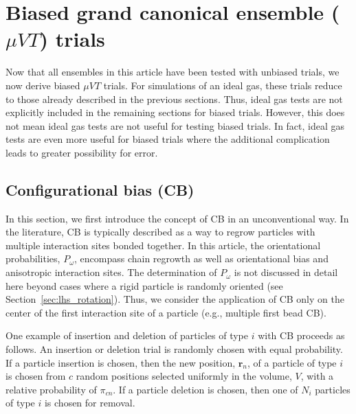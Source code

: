 \section{\label{sec:lhs_gcmc_bias}Biased grand canonical ensemble ($\mu VT$) trials}

Now that all ensembles in this article have been tested with unbiased trials, we now derive biased $\mu VT$ trials.
For simulations of an ideal gas, these trials reduce to those already described in the previous sections.
Thus, ideal gas tests are not explicitly included in the remaining sections for biased trials.
However, this does not mean ideal gas tests are not useful for testing biased trials.
In fact, ideal gas tests are even more useful for biased trials where the additional complication leads to greater possibility for error.

\subsection{\label{sec:lhs_insdel_cb}Configurational bias (CB)}

In this section, we first introduce the concept of CB \cite{rosenbluth_monte_1955, siepmann_configurational_1992, mooij_direct_1992, de_pablo_estimation_1992} in an unconventional way.
In the literature, CB is typically described as a way to regrow particles with multiple interaction sites bonded together.
In this article, the orientational probabilities, $P_{\omega}$, encompass chain regrowth as well as orientational bias and anisotropic interaction sites.
The determination of $P_{\omega}$ is not discussed in detail here beyond cases where a rigid particle is randomly oriented (see Section~\ref{sec:lhs_rotation}).
Thus, we consider the application of CB only on the center of the first interaction site of a particle (e.g., multiple first bead CB).

One example of insertion and deletion of particles of type $i$ with CB proceeds as follows.
An insertion or deletion trial is randomly chosen with equal probability.
If a particle insertion is chosen, then the new position, $\mathbf{r}_n$, of a particle of type $i$ is chosen from ${c}$ random positions selected uniformly in the volume, $V$, with a relative probability of $\pi_{cn}$.
If a particle deletion is chosen, then one of $N_i$ particles of type $i$ is chosen for removal.

